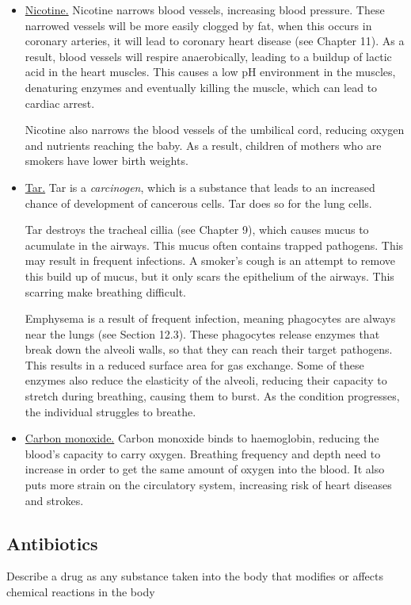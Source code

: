 \begin{itemize}
\item\underline{Nicotine.} Nicotine narrows blood vessels, increasing blood pressure. These
	narrowed vessels will be more easily clogged by fat, when this occurs in coronary arteries,
	it will lead to coronary heart disease (see Chapter 11). As a result, blood vessels will
	respire anaerobically, leading to a buildup of lactic acid in the heart muscles. This causes
	a low pH environment in the muscles, denaturing enzymes and eventually killing the muscle,
	which can lead to cardiac arrest. 

	Nicotine also narrows the blood vessels of the umbilical cord, reducing oxygen and nutrients
	reaching the baby. As a result, children of mothers who are smokers have lower birth weights.

\item\underline{Tar.} Tar is a \emph{carcinogen}, which is a substance that leads to an increased
	chance of development of cancerous cells. Tar does so for the lung cells.

	Tar destroys the tracheal cillia (see Chapter 9), which causes mucus to acumulate in the
	airways. This mucus often contains trapped pathogens. This may result in frequent infections.
	A smoker's cough is an attempt to remove this build up of mucus, but it only scars the
	epithelium of the airways. This scarring make breathing difficult.

	Emphysema is a result of frequent infection, meaning phagocytes are always near the lungs
	(see Section 12.3). These phagocytes release enzymes that break down the alveoli walls, 
	so that they can reach their target pathogens. This results in a reduced surface area for
	gas exchange. Some of these enzymes also reduce the elasticity of the alveoli, reducing their
	capacity to stretch during breathing, causing them to burst. As the condition progresses, the
	individual struggles to breathe.

\item\underline{Carbon monoxide.} Carbon monoxide binds to haemoglobin, reducing the blood's 
	capacity to carry oxygen. Breathing frequency and depth need to increase in order to get the
	same amount of oxygen into the blood. It also puts more strain on the circulatory system,
	increasing risk of heart diseases and strokes.
\end{itemize}

\subsection{Antibiotics}
\begin{point}
Describe a drug as any substance taken into the body that modifies or affects chemical reactions in the 
body
\end{point}

